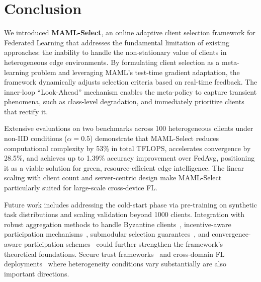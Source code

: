 \documentclass[journal]{IEEEtran}
\begin{document}
\section{Conclusion}
We introduced \textbf{MAML-Select}, an online adaptive client selection framework for Federated Learning that addresses the fundamental limitation of existing approaches: the inability to handle the non-stationary value of clients in heterogeneous edge environments. By formulating client selection as a meta-learning problem and leveraging MAML's test-time gradient adaptation, the framework dynamically adjusts selection criteria based on real-time feedback. The inner-loop ``Look-Ahead'' mechanism enables the meta-policy to capture transient phenomena, such as class-level degradation, and immediately prioritize clients that rectify it.

Extensive evaluations on two benchmarks across 100 heterogeneous clients under non-IID conditions ($\alpha = 0.5$) demonstrate that MAML-Select reduces computational complexity by 53\% in total TFLOPS, accelerates convergence by 28.5\%, and achieves up to 1.39\% accuracy improvement over FedAvg, positioning it as a viable solution for green, resource-efficient edge intelligence. The linear scaling with client count and server-centric design make MAML-Select particularly suited for large-scale cross-device FL.

Future work includes addressing the cold-start phase via pre-training on synthetic task distributions and scaling validation beyond 1000 clients. Integration with robust aggregation methods to handle Byzantine clients~\cite{bagdasaryan2020how}, incentive-aware participation mechanisms~\cite{jiao2021toward}, submodular selection guarantees~\cite{zhang2024submodular}, and convergence-aware participation schemes~\cite{crawshaw2024amplified} could further strengthen the framework's theoretical foundations. Secure trust frameworks~\cite{chen2025credible, ahmed2026secure} and cross-domain FL deployments~\cite{dey2025flyer} where heterogeneity conditions vary substantially are also important directions.

\FloatBarrier


\end{document}
